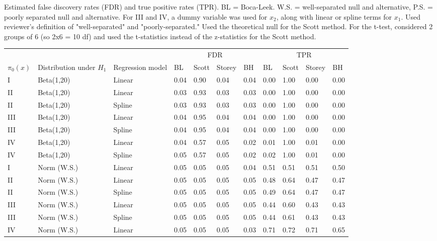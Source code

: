 \documentclass{article}\usepackage[]{graphicx}\usepackage[]{color}
\begin{document}
  
  Estimated false discovery rates (FDR) and true positive rates (TPR). BL = Boca-Leek. W.S. = well-separated null and alternative, P.S. = poorly separated null and alternative. For III and IV, a dummy variable was used for $x_{2}$, along with linear or spline terms for $x_1$. Used reviewer's definition of "well-separated" and "poorly-separated." Used the theoretical null for the Scott method. For the t-test, considered 2 groups of 6 (so 2x6 = 10 df) and used the t-statistics instead of the z-statistics for the Scott method.
\begin{table}[ht]
\centering
\begin{tabular}{lll|llll|llll}
  \hline
  &&& \multicolumn{4}{c}{FDR} & \multicolumn{4}{c}{TPR}\\
 $\pi_0(x)$ &  Distribution under $H_1$ & Regression model & BL & Scott & Storey & BH & BL & Scott & Storey & BH    \\
 \hline
I & Beta(1,20) & Linear & 0.04 & 0.90 & 0.04 & 0.04 & 0.00 & 1.00 & 0.00 & 0.00 \\ 
  II & Beta(1,20) & Linear & 0.03 & 0.93 & 0.03 & 0.03 & 0.00 & 1.00 & 0.00 & 0.00 \\ 
  II & Beta(1,20) & Spline & 0.03 & 0.93 & 0.03 & 0.03 & 0.00 & 1.00 & 0.00 & 0.00 \\ 
  III & Beta(1,20) & Linear & 0.04 & 0.95 & 0.04 & 0.04 & 0.00 & 1.00 & 0.00 & 0.00 \\ 
  III & Beta(1,20) & Spline & 0.04 & 0.95 & 0.04 & 0.04 & 0.00 & 1.00 & 0.00 & 0.00 \\ 
  IV & Beta(1,20) & Linear & 0.04 & 0.57 & 0.05 & 0.02 & 0.01 & 1.00 & 0.01 & 0.00 \\ 
  IV & Beta(1,20) & Spline & 0.05 & 0.57 & 0.05 & 0.02 & 0.02 & 1.00 & 0.01 & 0.00 \\ 
   \hline
I & Norm (W.S.) & Linear & 0.05 & 0.05 & 0.05 & 0.04 & 0.51 & 0.51 & 0.51 & 0.50 \\ 
  II & Norm (W.S.) & Linear & 0.05 & 0.05 & 0.05 & 0.05 & 0.48 & 0.64 & 0.47 & 0.47 \\ 
  II & Norm (W.S.) & Spline & 0.05 & 0.05 & 0.05 & 0.05 & 0.49 & 0.64 & 0.47 & 0.47 \\ 
  III & Norm (W.S.) & Linear & 0.05 & 0.05 & 0.05 & 0.05 & 0.44 & 0.60 & 0.43 & 0.43 \\ 
  III & Norm (W.S.) & Spline & 0.05 & 0.05 & 0.05 & 0.05 & 0.44 & 0.61 & 0.43 & 0.43 \\ 
  IV & Norm (W.S.) & Linear & 0.05 & 0.05 & 0.05 & 0.03 & 0.71 & 0.72 & 0.71 & 0.65 \\ 

\end{tabular}
\end{table}
\end{document}
